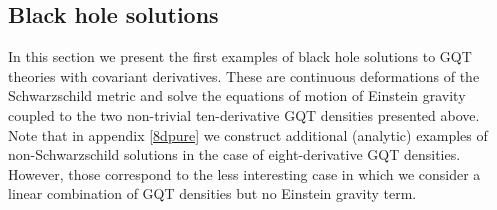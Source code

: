 \documentclass[11pt]{article}
\newcommand{\comment}[1]{{\bf [[[#1]]]}}
\newcommand{\rah}[1]{{\bf {\color{red}[Robie: #1]}}}
\begin{document}
{%





\subsection{Black hole solutions}
In this section we present the first examples of black hole solutions to GQT theories with covariant derivatives. These are continuous deformations of the Schwarzschild metric and solve the equations of motion of Einstein gravity coupled to the two non-trivial ten-derivative GQT densities presented above.  Note that in appendix \ref{8dpure} we construct additional  (analytic) examples of non-Schwarzschild solutions in the case of eight-derivative GQT densities. However, those correspond to the less interesting case in which we consider a linear combination of GQT densities but no Einstein gravity term. 

}
\end{document}
